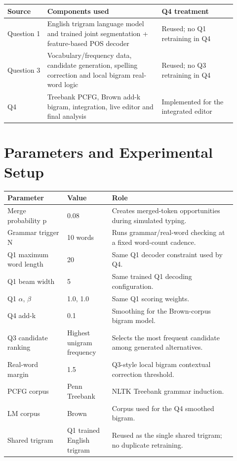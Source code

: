 \documentclass[11pt]{article}
\begin{document}
\begin{longtable}{@{}p{0.16\linewidth}p{0.46\linewidth}p{0.30\linewidth}@{}}
\toprule
\textbf{Source} & \textbf{Components used} & \textbf{Q4 treatment} \\
\midrule
\endhead
Question 1 & English trigram language model and trained joint segmentation + feature-based POS decoder & Reused; no Q1 retraining in Q4 \\
Question 3 & Vocabulary/frequency data, candidate generation, spelling correction and local bigram real-word logic & Reused; no Q3 retraining in Q4 \\
Q4 & Treebank PCFG, Brown add-k bigram, integration, live editor and final analysis & Implemented for the integrated editor \\
\bottomrule
\end{longtable}

\section{Parameters and Experimental Setup}

\begin{longtable}{@{}p{0.24\linewidth}p{0.18\linewidth}p{0.50\linewidth}@{}}
\toprule
\textbf{Parameter} & \textbf{Value} & \textbf{Role} \\
\midrule
\endhead
Merge probability p & 0.08 & Creates merged-token opportunities during simulated typing. \\
Grammar trigger N & 10 words & Runs grammar/real-word checking at a fixed word-count cadence. \\
Q1 maximum word length & 20 & Same Q1 decoder constraint used by Q4. \\
Q1 beam width & 5 & Same trained Q1 decoding configuration. \\
Q1 $\alpha$, $\beta$ & 1.0, 1.0 & Same Q1 scoring weights. \\
Q4 add-k & 0.1 & Smoothing for the Brown-corpus bigram model. \\
Q3 candidate ranking & Highest unigram frequency & Selects the most frequent candidate among generated alternatives. \\
Real-word margin & 1.5 & Q3-style local bigram contextual correction threshold. \\
PCFG corpus & Penn Treebank & NLTK Treebank grammar induction. \\
LM corpus & Brown & Corpus used for the Q4 smoothed bigram. \\
Shared trigram & Q1 trained English trigram & Reused as the single shared trigram; no duplicate retraining. \\
\bottomrule
\end{longtable}
\end{document}
